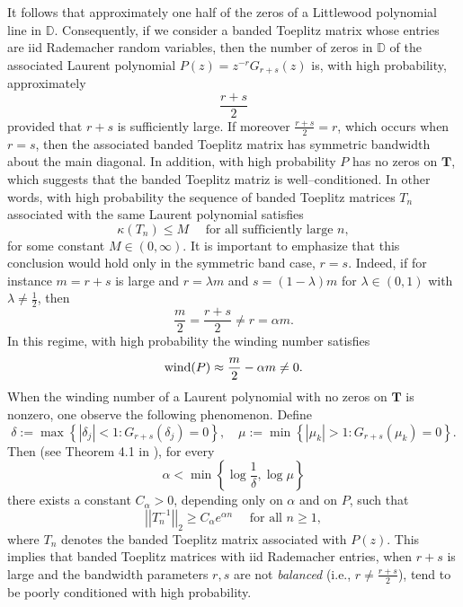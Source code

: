 \documentclass[12pt]{amsart}
\theoremstyle{plain}
\numberwithin{equation}{section}
\newcommand{\<}{\langle}
\renewcommand{\>}{\rangle}
\newcommand{\LL}[1]{\left\{#1\right\}}
\newcommand{\abs}[1]{\left|#1\right|}
\newcommand{\norm}[1]{\left|\left|#1\right|\right|}
\begin{document}
It follows that approximately one half of the zeros of a Littlewood polynomial line in $\mathds{D}$. Consequently, if we consider a banded Toeplitz matrix whose entries are iid Rademacher random variables, then the number of zeros in $\mathds{D}$ of the associated Laurent polynomial $P(z)=z^{-r} G_{r+s}(z)$ is, with high probability, approximately
\[
\frac{r+s}{2}
\]
provided that $r+s$ is sufficiently large. If moreover $\frac{r+s}{2} = r$, which occurs when $r=s$, then the associated banded Toeplitz matrix has symmetric bandwidth about the main diagonal. In addition, with high probability $P$ has no zeros on $\mathbf{T}$, which suggests that the banded Toeplitz matriz is well--conditioned. In other words, with high probability the sequence of banded Toeplitz matrices ${T_n}$ associated with the same Laurent polynomial satisfies 
\[
\kappa(T_n) \leq M \quad \mbox{ for all sufficiently large $n$},
\]
for some constant $M\in(0,\infty)$. It is important to emphasize that this conclusion would hold only in the symmetric band case, $r=s$. Indeed, if for instance $m=r+s$ is large and $r=\lambda m$ and $s=(1-\lambda)m$ for $\lambda\in(0,1)$ with $\lambda \neq \frac{1}{2}$, then
\[
\frac{m}{2} = \frac{r+s}{2} \neq r = \alpha m.
\]
In this regime, with high probability the winding number satisfies 
\[
\textnormal{wind}(P) \approx \frac{m}{2} - \alpha m \neq 0.
\]
When the winding number of a Laurent polynomial with no zeros on $\mathbf{T}$ is nonzero, one observe the following phenomenon. Define
\[
\delta := \max\LL{\abs{\delta_j}<1 : G_{r+s}(\delta_j)=0 }, \quad \mu := \min\LL{\abs{\mu_k}>1 : G_{r+s}(\mu_k)=0 }.
\]
Then (see Theorem 4.1 in \cite{bottcher2005spectral}), for every
\[
\alpha < \min\LL{\log\frac{1}{\delta},\log \mu}
\]
there exists a constant $C_{\alpha}>0$, depending only on $\alpha$ and on $P$, such that
\[
\norm{T_n^{-1}}_2 \geq C_{\alpha} e^{\alpha n}\quad \mbox{ for all $n\geq 1$},
\] 
where $T_n$ denotes the banded Toeplitz matrix associated with $P(z)$. This implies that banded Toeplitz matrices with iid Rademacher entries, when $r+s$ is large and the bandwidth parameters $r,s$ are not {\it balanced} (i.e., $r\neq \frac{r+s}{2}$), tend to be poorly conditioned with high probability.
\end{document}
